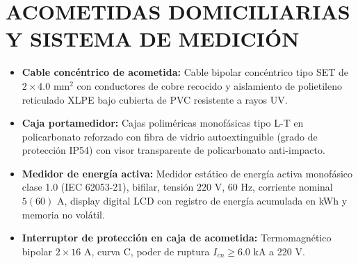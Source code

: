 \section{ACOMETIDAS DOMICILIARIAS Y SISTEMA DE MEDICIÓN}

\begin{itemize}
  \item \textbf{Cable concéntrico de acometida:} Cable bipolar concéntrico tipo SET de $2 \times 4.0\text{ mm}^2$ con conductores de cobre recocido y aislamiento de polietileno reticulado XLPE bajo cubierta de PVC resistente a rayos UV.
  \item \textbf{Caja portamedidor:} Cajas poliméricas monofásicas tipo L-T en policarbonato reforzado con fibra de vidrio autoextinguible (grado de protección IP54) con visor transparente de policarbonato anti-impacto.
  \item \textbf{Medidor de energía activa:} Medidor estático de energía activa monofásico clase 1.0 (IEC 62053-21), bifilar, tensión $220\text{ V}$, $60\text{ Hz}$, corriente nominal $5(60)\text{ A}$, display digital LCD con registro de energía acumulada en kWh y memoria no volátil.
  \item \textbf{Interruptor de protección en caja de acometida:} Termomagnético bipolar $2 \times 16\text{ A}$, curva C, poder de ruptura $I_{cn} \ge 6.0\text{ kA}$ a 220 V.
\end{itemize}
